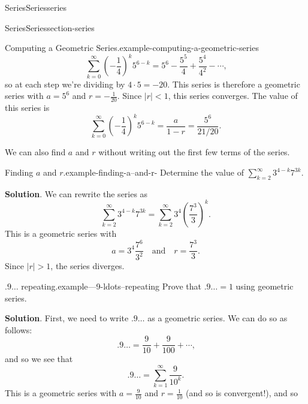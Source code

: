 \documentclass[oneside,10pt,]{book}
\numberwithin{equation}{section}
\newcommand{\lt}{<}
\begin{document}
\begin{chapterptx}{Series}{}{Series}{}{}{series}
\begin{sectionptx}{Series}{}{Series}{}{}{section-series}
\begin{example}{Computing a Geometric Series.}{example-computing-a-geometric-series}
\begin{equation*}
\sum_{k=0}^{\infty}\left(-\frac{1}{4}\right)^{k} 5^{6 - k} = 5^{6} - \frac{5^{5}}{4} + \frac{5^{4}}{4^{2}} - \cdots\text{,}
\end{equation*}
so at each step we're dividing by \(4\cdot5 = -20\). This series is therefore a geometric series with \(a = 5^{6}\) and \(r = -\frac{1}{20}\). Since \(|r| \lt 1\), this series converges. The value of this series is%
\begin{equation*}
\sum_{k=0}^{\infty}\left(-\frac{1}{4}\right)^{k} 5^{6 - k} = \frac{a}{1 - r} = \frac{5^{6}}{21/20}\text{.}
\end{equation*}
%
\end{example}
\hypertarget{p-845}{}%
We can also find \(a\) and \(r\) without writing out the first few terms of the series.%
\begin{example}{Finding \(a\) and \(r\).}{example-finding-a--and-r-}%
\hypertarget{p-846}{}%
Determine the value of \(\sum_{k=2}^{\infty}3^{4 - k}7^{3k}\).%
\par\smallskip%
\noindent\textbf{Solution}.\hypertarget{solution-174}{}\quad%
\hypertarget{p-847}{}%
We can rewrite the series as%
\begin{equation*}
\sum_{k=2}^{\infty}3^{4 - k}7^{3k} = \sum_{k=2}^{\infty}3^{4}\left(\frac{7^{3}}{3}\right)^{k}\text{.}
\end{equation*}
This is a geometric series with%
\begin{equation*}
a = 3^{4}\frac{7^{6}}{3^{2}}\quad\text{and}\quad r = \frac{7^{3}}{3}\text{.}
\end{equation*}
Since \(|r| > 1\), the series diverges.%
\end{example}
\begin{example}{\(.9\ldots\) repeating.}{example---9-ldots--repeating}%
\hypertarget{p-848}{}%
Prove that \(.9\ldots = 1\) using geometric series.%
\par\smallskip%
\noindent\textbf{Solution}.\hypertarget{solution-175}{}\quad%
\hypertarget{p-849}{}%
First, we need to write \(.9\ldots\) as a geometric series. We can do so as follows:%
\begin{equation*}
.9\ldots = \frac{9}{10} + \frac{9}{100} + \cdots\text{,}
\end{equation*}
and so we see that%
\begin{equation*}
.9\ldots = \sum_{k=1}^{\infty}\frac{9}{10^{k}}\text{.}
\end{equation*}
This is a geometric series with \(a = \frac{9}{10}\) and \(r = \frac{1}{10}\) (and so is convergent!), and so%

\end{example}
\end{sectionptx}
\end{chapterptx}
\end{document}
